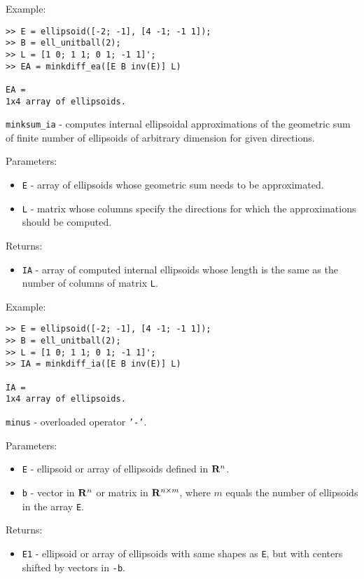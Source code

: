 Example:
{\tt \begin{verbatim}
>> E = ellipsoid([-2; -1], [4 -1; -1 1]);
>> B = ell_unitball(2);
>> L = [1 0; 1 1; 0 1; -1 1]';
>> EA = minkdiff_ea([E B inv(E)] L)

EA =
1x4 array of ellipsoids.
\end{verbatim} }

\newpage

{\Large {\tt minksum\_ia}} - computes internal ellipsoidal approximations
of the geometric sum of finite number of ellipsoids of arbitrary dimension
for given directions.

Parameters:
\begin{itemize}
\item {\tt E} - array of ellipsoids whose geometric sum needs to be
approximated.
\item {\tt L} - matrix whose columns specify the directions for which
the approximations should be computed.
\end{itemize}

Returns:
\begin{itemize}
\item {\tt IA} - array of computed internal ellipsoids whose length is the same
as the number of columns of matrix {\tt L}.
\end{itemize}

Example:
{\tt \begin{verbatim}
>> E = ellipsoid([-2; -1], [4 -1; -1 1]);
>> B = ell_unitball(2);
>> L = [1 0; 1 1; 0 1; -1 1]';
>> IA = minkdiff_ia([E B inv(E)] L)

IA =
1x4 array of ellipsoids.
\end{verbatim} }

\newpage

{\Large {\tt minus}} - overloaded operator {\tt '-'}.

Parameters:
\begin{itemize}
\item {\tt E} - ellipsoid or array of ellipsoids defined in ${\bf R}^n$.
\item {\tt b} - vector in ${\bf R}^n$ or matrix in ${\bf R}^{n\times m}$,
where $m$ equals the number of ellipsoids in the array {\tt E}.
\end{itemize}

Returns:
\begin{itemize}
\item {\tt E1} - ellipsoid or array of ellipsoids with same shapes as {\tt E},
but with centers shifted by vectors in {\tt -b}.
\end{itemize}

